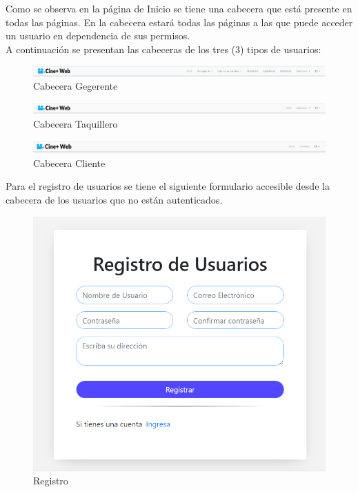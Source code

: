 Como se observa en la página de Inicio se tiene una cabecera que está presente en todas las páginas. En la cabecera estará todas las páginas a las que puede acceder un usuario en dependencia de sus permisos.\\

A continuación se presentan las cabeceras de los tres (3) tipos de usuarios:\\

\begin{figure}[h!]
	\centering
	\includegraphics[scale=0.4]{./chapters/img/header_admin.png}
	
	\label{fig:header_admin}
	\caption{Cabecera Gegerente}
\end{figure}
\begin{figure}[h!]
	\centering
	\includegraphics[scale=0.4]{./chapters/img/header_taquillero.png}
	
	\label{fig:header_taquillero}
	\caption{Cabecera Taquillero}
\end{figure}
\begin{figure}[h!]
	\centering
	\includegraphics[scale=0.4]{./chapters/img/header_client.png}
	
	\label{fig:header_client}
	\caption{Cabecera Cliente}
\end{figure}


Para el registro de usuarios se tiene el siguiente formulario accesible desde la cabecera de los usuarios que no están autenticados.
\newpage

\begin{figure}[h!]
	\centering
	\includegraphics[scale=0.4]{./chapters/img/register.png}
	
	\label{fig:register}
	\caption{Registro}
\end{figure}

